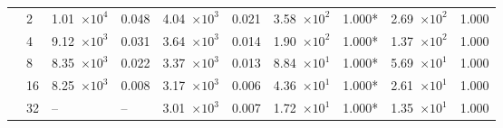 \begin{table}[h]
\begin{center}
\begin{small}
\begin{sc}
\begin{tabular}{|c|l|p{1.2cm}|p{0.8cm}|p{1.2cm}|p{0.8cm}|p{1.2cm}|p{0.8cm}|p{1.2cm}|p{0.8cm}|}
                    & 2  & 1.01~$\times10^{4}$ & 0.048 & 4.04~$\times10^{3}$ & 0.021 & 3.58~$\times10^{2}$ & 1.000* & 2.69~$\times10^{2}$ & 1.000 \\\cline{2-10}
                    & 4  & 9.12~$\times10^{3}$ & 0.031 & 3.64~$\times10^{3}$ & 0.014 & 1.90~$\times10^{2}$ & 1.000* & 1.37~$\times10^{2}$ & 1.000 \\\cline{2-10}
                    & 8  & 8.35~$\times10^{3}$ & 0.022 & 3.37~$\times10^{3}$ & 0.013 & 8.84~$\times10^{1}$ & 1.000* & 5.69~$\times10^{1}$ & 1.000 \\\cline{2-10}
                    & 16 & 8.25~$\times10^{3}$ & 0.008 & 3.17~$\times10^{3}$ & 0.006 & 4.36~$\times10^{1}$ & 1.000* & 2.61~$\times10^{1}$ & 1.000 \\\cline{2-10}
                    & 32 & --                  & --    & 3.01~$\times10^{3}$ & 0.007 & 1.72~$\times10^{1}$ & 1.000* & 1.35~$\times10^{1}$ & 1.000 \\
                    \hline
                \end{tabular}
            \end{sc}
        \end{small}
    \end{center}
    \vskip -0.1in
\end{table}
